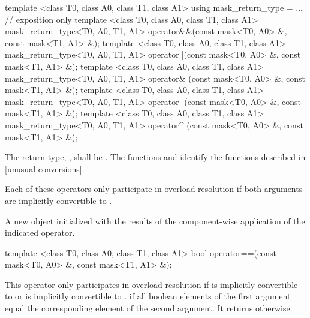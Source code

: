 \begin{itemdecl}
template <class T0, class A0, class T1, class A1> using mask_return_type = ...  // exposition only
template <class T0, class A0, class T1, class A1>
mask_return_type<T0, A0, T1, A1> operator&&(const mask<T0, A0> &, const mask<T1, A1> &);
template <class T0, class A0, class T1, class A1>
mask_return_type<T0, A0, T1, A1> operator||(const mask<T0, A0> &, const mask<T1, A1> &);
template <class T0, class A0, class T1, class A1>
mask_return_type<T0, A0, T1, A1> operator& (const mask<T0, A0> &, const mask<T1, A1> &);
template <class T0, class A0, class T1, class A1>
mask_return_type<T0, A0, T1, A1> operator| (const mask<T0, A0> &, const mask<T1, A1> &);
template <class T0, class A0, class T1, class A1>
mask_return_type<T0, A0, T1, A1> operator^ (const mask<T0, A0> &, const mask<T1, A1> &);
\end{itemdecl}
\begin{itemdescr}
  \newcommand\maskreturntype{\xspace}
  \pnum\remarks The return type, \maskreturntype, shall be .
    The functions  and  identify the functions described in \ref{unusual conversions}.

  \pnum\remarks Each of these operators only participate in overload resolution if both arguments are implicitly convertible to \maskreturntype.

  \pnum\returns A new \mask object initialized with the results of the component-wise application of the indicated operator.
\end{itemdescr}

\begin{itemdecl}
template <class T0, class A0, class T1, class A1>
bool operator==(const mask<T0, A0> &, const mask<T1, A1> &);
\end{itemdecl}
\newcommand\maskCompareRemark{\pnum\remarks This operator only participates in overload resolution if \mask[<T0, A0>] is implicitly convertible to \mask[<T1, A1>] or \mask[<T1, A1>] is implicitly convertible to \mask[<T0, A0>].}
\begin{itemdescr}
  \maskCompareRemark
  \pnum\returns \true if all boolean elements of the first argument equal the corresponding element of the second argument.
  It returns \false otherwise.
\end{itemdescr}

